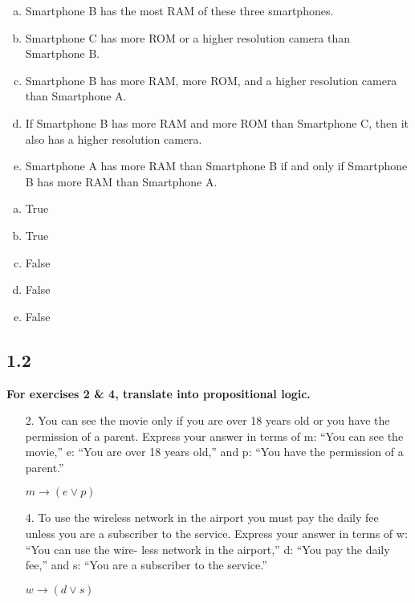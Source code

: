 \begin{itemize}
\begin{enumerate}[a.]
    \item Smartphone B has the most RAM of these three smartphones.
    \item Smartphone C has more ROM or a higher resolution camera than Smartphone B.
    \item Smartphone B has more RAM, more ROM, and a higher resolution camera than Smartphone A.
    \item If Smartphone B has more RAM and more ROM than Smartphone C, then it also has a higher resolution camera.
    \item Smartphone A has more RAM than Smartphone B if and only if Smartphone B has more RAM than Smartphone A.
\end{enumerate}
\answer
\begin{enumerate}[a.]
    \item True
    \item True
    \item False
    \item False
    \item False
\end{enumerate}
\end{itemize}
\subsection{1.2}
\textbf{For exercises 2 \& 4, translate into propositional logic.}
\begin{itemize}
    \item [2.]You can see the movie only if you are over 18 years old or you have the permission of a parent. Express your answer in terms of m: “You can see the movie,” e: “You are over 18 years old,” and p: “You have the permission of a parent.”

          \answer $m \to (e \lor p)$
    \item[4.]To use the wireless network in the airport you must pay the daily fee unless you are a subscriber to the service. Express your answer in terms of w: “You can use the wire-
          less network in the airport,” d: “You pay the daily fee,” and s: “You are a subscriber to the service.”

          \answer $w \to (d \lor s)$
\end{itemize}

